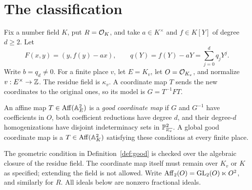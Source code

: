 \section{The classification}\label{sec:classification}

Fix a number field $K$, put $R=\mathcal O_K$, and take $a\in K^\times$
and $f\in K[Y]$ of degree $d\ge2$. Let
\begin{equation}\label{eq:Fq}
 F(x,y)=(y,f(y)-ax),\qquad
 q(Y)=f(Y)-aY=\sum_{j=0}^d q_jY^j.
\end{equation}
Write $b=q_d\ne0$. For a finite place $v$, let $E=K_v$, let
$O=\mathcal O_{K_v}$, and normalize $v:E^\times\to\mathbb Z$.
The residue field is $\kappa_v$. A coordinate map $T$ sends the new
coordinates to the original ones, so its model is $G=T^{-1}FT$.

\begin{definition}\label{def:good}
An affine map $T\in\operatorname{Aff}(\mathbb A^2_E)$ is a \emph{good coordinate
map} if $G$ and $G^{-1}$ have coefficients in $O$, both coefficient
reductions have degree $d$, and their degree-$d$ homogenizations have
disjoint indeterminacy sets in $\mathbb P^2_{\overline{\kappa_v}}$.
A global good coordinate map is a $T\in\operatorname{Aff}(\mathbb A^2_K)$ satisfying
these conditions at every finite place.
\end{definition}

The geometric condition in Definition~\ref{def:good} is checked over
the algebraic closure of the residue field. The coordinate map itself
must remain over $K_v$ or $K$ as specified; extending the field is not
allowed. Write $\operatorname{Aff}_2(O)=\operatorname{GL}_2(O)\ltimes O^2$, and similarly for $R$.
All ideals below are nonzero fractional ideals.


